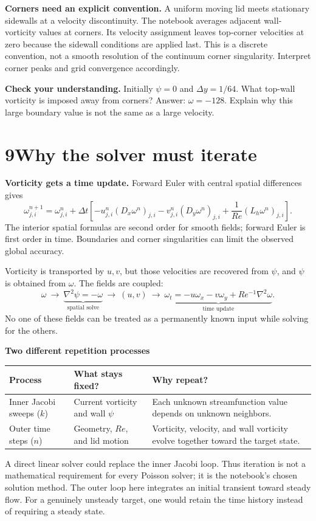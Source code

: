 \documentclass[11pt]{article}
\newcommand{\topic}[2]{\section*{#1\quad #2}\addcontentsline{toc}{section}{#1: #2}}
\newcommand{\checkpoint}[1]{\par\smallskip\noindent\textcolor{accent}{\textbf{Check your understanding.}} #1\par}
\begin{document}
\textbf{Corners need an explicit convention.} A uniform moving lid meets stationary sidewalls at a velocity discontinuity. The notebook averages adjacent wall-vorticity values at corners. Its velocity assignment leaves top-corner velocities at zero because the sidewall conditions are applied last. This is a discrete convention, not a smooth resolution of the continuum corner singularity. Interpret corner peaks and grid convergence accordingly.

\checkpoint{Initially $\psi=0$ and $\Delta y=1/64$. What top-wall vorticity is imposed away from corners? Answer: $\omega=-128$. Explain why this large boundary value is not the same as a large velocity.}
\newpage
\topic{9}{Why the solver must iterate}\label{sec:iteration}
\textbf{Vorticity gets a time update.} Forward Euler with central spatial differences gives
\begin{equation}
\omega^{n+1}_{j,i}=\omega^n_{j,i}+\Delta t\left[-u^n_{j,i}(D_x\omega^n)_{j,i}-v^n_{j,i}(D_y\omega^n)_{j,i}+\frac{1}{Re}(L_h\omega^n)_{j,i}\right].
\end{equation}
The interior spatial formulas are second order for smooth fields; forward Euler is first order in time. Boundaries and corner singularities can limit the observed global accuracy.


Vorticity is transported by $u,v$, but those velocities are recovered from $\psi$, and $\psi$ is obtained from $\omega$. The fields are coupled:
\[
\omega\ \longrightarrow\ \underbrace{\nabla^2\psi=-\omega}_{\text{spatial solve}}\ \longrightarrow\ (u,v)\ \longrightarrow\ \underbrace{\omega_t=-u\omega_x-v\omega_y+Re^{-1}\nabla^2\omega}_{\text{time update}}.
\]
No one of these fields can be treated as a permanently known input while solving for the others.

\textbf{Two different repetition processes}
\begin{center}\begin{tabular}{p{.18\linewidth}p{.34\linewidth}p{.37\linewidth}}\toprule
Process & What stays fixed? & Why repeat?\\\midrule
Inner Jacobi sweeps ($k$) & Current vorticity and wall $\psi$ & Each unknown streamfunction value depends on unknown neighbors.\\[5pt]
Outer time steps ($n$) & Geometry, $Re$, and lid motion & Vorticity, velocity, and wall vorticity evolve together toward the target state.\\\bottomrule
\end{tabular}\end{center}
A direct linear solver could replace the inner Jacobi loop. Thus iteration is not a mathematical requirement for every Poisson solver; it is the notebook's chosen solution method. The outer loop here integrates an initial transient toward steady flow. For a genuinely unsteady target, one would retain the time history instead of requiring a steady state.
\end{document}
